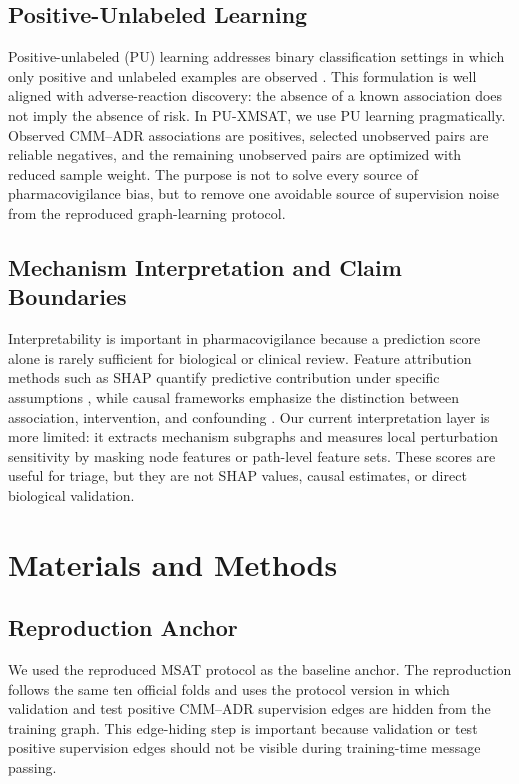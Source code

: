 \documentclass[manuscript,screen,review]{acmart}
\newcommand{\msat}{MSAT}
\newcommand{\px}{PU-XMSAT}
\begin{document}
\subsection{Positive-Unlabeled Learning}

Positive-unlabeled (PU) learning addresses binary classification settings in which only positive and unlabeled examples are observed \cite{elkan2008learning,bekker2020learning,kiryo2017positive}. This formulation is well aligned with adverse-reaction discovery: the absence of a known association does not imply the absence of risk. In \px{}, we use PU learning pragmatically. Observed CMM--ADR associations are positives, selected unobserved pairs are reliable negatives, and the remaining unobserved pairs are optimized with reduced sample weight. The purpose is not to solve every source of pharmacovigilance bias, but to remove one avoidable source of supervision noise from the reproduced graph-learning protocol.

\subsection{Mechanism Interpretation and Claim Boundaries}

Interpretability is important in pharmacovigilance because a prediction score alone is rarely sufficient for biological or clinical review. Feature attribution methods such as SHAP quantify predictive contribution under specific assumptions \cite{lundberg2017unified}, while causal frameworks emphasize the distinction between association, intervention, and confounding \cite{pearl2009causality}. Our current interpretation layer is more limited: it extracts mechanism subgraphs and measures local perturbation sensitivity by masking node features or path-level feature sets. These scores are useful for triage, but they are not SHAP values, causal estimates, or direct biological validation.

\section{Materials and Methods}

\subsection{Reproduction Anchor}

We used the reproduced \msat{} protocol as the baseline anchor. The reproduction follows the same ten official folds and uses the protocol version in which validation and test positive CMM--ADR supervision edges are hidden from the training graph. This edge-hiding step is important because validation or test positive supervision edges should not be visible during training-time message passing.
\end{document}
